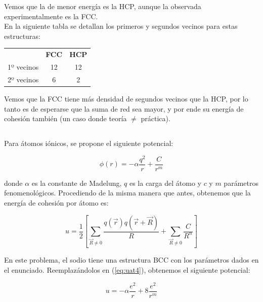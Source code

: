 \documentclass[a4paper]{article}
\begin{document}
Vemos que la de menor energ\'ia es la HCP, aunque la observada experimentalmente es la FCC.\\

En la siguiente tabla se detallan los primeros y segundos vecinos para estas estructuras:\\

\begin{center}
\begin{tabular}{|ccc|}
\hline
	 & \textbf{FCC} & \textbf{HCP}\\
	1º vecinos & 12 & 12\\
	2º vecinos & 6 & 2\\
\hline
\end{tabular}
\end{center}

Vemos que la FCC tiene m\'as densidad de segundos vecinos que la HCP, por lo tanto es de esperarse que la suma de red sea mayor, y por ende su energ\'ia de cohesi\'on tambi\'en (un caso donde teor\'ia $\neq$ pr\'actica).

\subsection{}

Para \'atomos i\'onicos, se propone el siguiente potencial:

\begin{equation}
\label{eq:cb}
\phi(r) = -\alpha\frac{q^{2}}{r} + \frac{C}{r^{m}}
\end{equation}

donde $\alpha$ es la constante de Madelung, $q$ es la carga del \'atomo y $c$ y $m$ par\'ametros fenomenol\'ogicos. Procediendo de la misma manera que antes, obtenemos que la energ\'ia de cohesi\'on por \'atomo es:

\begin{equation}
\label{eq:uat4}
u = \frac{1}{2}\left[ \sum_{\vec{R} \neq 0} \frac{q(\vec{r})q(\vec{r} + \vec{R})}{R} + \sum_{\vec{R} \neq 0} \frac{C}{R^{n}} \right]
\end{equation}

En este problema, el sodio tiene una estructura BCC con los par\'ametros dados en el enunciado. Reemplaz\'andolos en (\ref{eq:uat4}), obtenemos el siguiente potencial:

$$u = -\alpha \frac{e^{2}}{r} + 8\frac{e^{2}}{r^{m}}$$




\newpage
\begin{thebibliography}{99} %
 
\end{thebibliography}


\end{document}
